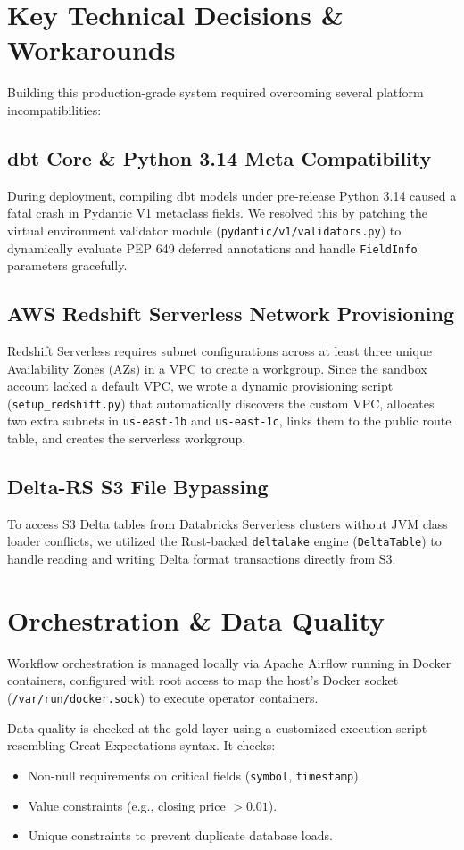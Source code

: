 \documentclass[11pt,a4paper]{article}
\begin{document}
\section{Key Technical Decisions \& Workarounds}
Building this production-grade system required overcoming several platform incompatibilities:

\subsection{dbt Core \& Python 3.14 Meta Compatibility}
During deployment, compiling dbt models under pre-release Python 3.14 caused a fatal crash in Pydantic V1 metaclass fields. We resolved this by patching the virtual environment validator module (\texttt{pydantic/v1/validators.py}) to dynamically evaluate PEP 649 deferred annotations and handle \texttt{FieldInfo} parameters gracefully.

\subsection{AWS Redshift Serverless Network Provisioning}
Redshift Serverless requires subnet configurations across at least three unique Availability Zones (AZs) in a VPC to create a workgroup. Since the sandbox account lacked a default VPC, we wrote a dynamic provisioning script (\texttt{setup_redshift.py}) that automatically discovers the custom VPC, allocates two extra subnets in \texttt{us-east-1b} and \texttt{us-east-1c}, links them to the public route table, and creates the serverless workgroup.

\subsection{Delta-RS S3 File Bypassing}
To access S3 Delta tables from Databricks Serverless clusters without JVM class loader conflicts, we utilized the Rust-backed \texttt{deltalake} engine (\texttt{DeltaTable}) to handle reading and writing Delta format transactions directly from S3.

\section{Orchestration \& Data Quality}
Workflow orchestration is managed locally via Apache Airflow running in Docker containers, configured with root access to map the host's Docker socket (\texttt{/var/run/docker.sock}) to execute operator containers.

Data quality is checked at the gold layer using a customized execution script resembling Great Expectations syntax. It checks:
\begin{itemize}
    \item Non-null requirements on critical fields (\texttt{symbol}, \texttt{timestamp}).
    \item Value constraints (e.g., closing price $> 0.01$).
    \item Unique constraints to prevent duplicate database loads.
\end{itemize}
\end{document}
